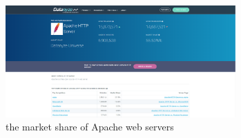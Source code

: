 \begin{figure}[H] \label{the market share of Apache web servers}
    \centering
    \includegraphics[width=88mm,scale=0.8]{Apdenix/MarketshareApache.PNG}
    \caption{the market share of Apache web servers \cite{Apache}}
    \label{the market share of Apache web servers}
\end{figure}